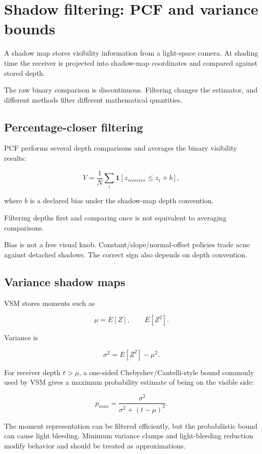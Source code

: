 \hypertarget{appendix-7cac8a689849}{}
\section{Shadow filtering: PCF and variance bounds}\label{appendix-7cac8a689849-shadow-filtering-pcf-and-variance-bounds}

A shadow map stores visibility information from a light-space camera. At shading time the receiver is projected into shadow-map coordinates and compared against stored depth.

The raw binary comparison is discontinuous. Filtering changes the estimator, and different methods filter different mathematical quantities.

\subsection{Percentage-closer filtering}\label{appendix-7cac8a689849-percentage-closer-filtering}

PCF performs several depth comparisons and averages the binary visibility results:

\[
V=
\frac{1}{N}
\sum_i
\mathbf 1[z_{receiver}\le z_i+b],
\]

where \(b\) is a declared bias under the shadow-map depth convention.

Filtering depths first and comparing once is not equivalent to averaging comparisons.

Bias is not a free visual knob. Constant/slope/normal-offset policies trade acne against detached shadows. The correct sign also depends on depth convention.

\subsection{Variance shadow maps}\label{appendix-7cac8a689849-variance-shadow-maps}

VSM stores moments such as

\[
\mu=E[Z],
\qquad
E[Z^2].
\]

Variance is

\[
\sigma^2=E[Z^2]-\mu^2.
\]

For receiver depth \(t>\mu\), a one-sided Chebyshev/Cantelli-style bound commonly used by VSM gives a maximum probability estimate of being on the visible side:

\[
p_{max}
=
\frac{\sigma^2}
{\sigma^2+(t-\mu)^2}.
\]

The moment representation can be filtered efficiently, but the probabilistic bound can cause light bleeding. Minimum variance clamps and light-bleeding reduction modify behavior and should be treated as approximations.

